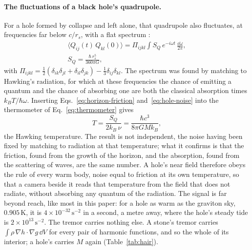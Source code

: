 \paragraph{The fluctuations of a black hole's quadrupole.} For a hole formed by
collapse and left alone, that quadrupole also fluctuates, at frequencies far below
$c/r_s$, with a flat spectrum \cite{GoldbergerRothstein2020}:
\begin{equation}\label{eq:hole-noise}
\begin{gathered}
\langle Q_{ij}(t)\,Q_{kl}(0)\rangle
= \Pi_{ijkl}\int S_Q\,e^{-i\omega t}\,\frac{\dd\omega}{2\pi},\\
S_Q = \frac{\hbar\,r_s^5}{360\pi G} ,
\end{gathered}
\end{equation}
with $\Pi_{ijkl} = \tfrac12(\delta_{ik}\delta_{jl} + \delta_{il}\delta_{jk})
- \tfrac13\delta_{ij}\delta_{kl}$. The spectrum was found by matching to Hawking's radiation, for which at
these frequencies the chance of emitting a quantum and the chance of absorbing
one are both the classical absorption times $k_BT/\hbar\omega$. Inserting
Eqs.~\eqref{eq:horizon-friction} and~\eqref{eq:hole-noise} into the thermometer
of Eq.~\eqref{eq:thermometer} gives
\begin{equation}\label{eq:hole-thermometer}
T = \frac{S_Q}{2k_B\,\nu} = \frac{\hbar c^3}{8\pi G M k_B} ,
\end{equation}
the Hawking temperature. The result is not independent, the noise
having been fixed by matching to radiation at that temperature; what it confirms
is that the friction, found from the growth of the horizon, and the absorption,
found from the scattering of waves, are the same number. A hole's near field
therefore obeys the rule of every warm body, noise equal to
friction at its own temperature, so that a camera beside it reads that
temperature from the field that does not radiate, without absorbing any quantum of
the radiation. The signal is far beyond reach, like most in this
paper: for a hole as warm as the graviton sky, $0.905\,\mathrm{K}$, it is
$4\times10^{-32}\,\mathrm{s^{-2}}$ in a second, a metre away, where the hole's
steady tide is $2\times10^{13}\,\mathrm{s^{-2}}$. The tremor carries nothing
else. A stone's tremor carries $\int\rho\,\nabla h\cdot\nabla g\,\dd V$ for
every pair of harmonic functions, and so the whole of its interior; a hole's
carries $M$ again (Table~\ref{tab:hair}).

